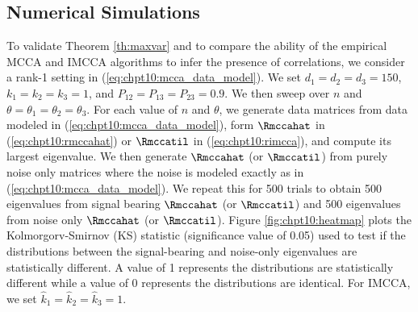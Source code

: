 \subsection{Numerical Simulations}\label{sec:num_sims}

To validate Theorem \ref{th:maxvar} and to compare the ability of the empirical MCCA
and IMCCA algorithms to infer the presence of correlations, we consider a rank-1 setting in (\ref{eq:chpt10:mcca_data_model}).  We set $d_1 =d_2=d_3=150$, $k_1=k_2=k_3=1$, and
$P_{12}=P_{13}=P_{23}=0.9$. We then sweep over $n$ and
$\theta=\theta_1=\theta_2=\theta_3$. For each value of $n$ and $\theta$, we generate data
matrices from data modeled in (\ref{eq:chpt10:mcca_data_model}), form $\Rmccahat$ in
(\ref{eq:chpt10:rmccahat}) or $\Rmccatil$ in (\ref{eq:chpt10:rimcca}), and compute its
largest eigenvalue. We then generate $\Rmccahat$ (or $\Rmccatil$) from purely noise only
matrices where the noise is modeled exactly as in (\ref{eq:chpt10:mcca_data_model}). We
repeat this for 500 trials to obtain 500 eigenvalues from signal bearing $\Rmccahat$ (or
$\Rmccatil$) and 500 eigenvalues from noise only $\Rmccahat$ (or $\Rmccatil$). Figure
\ref{fig:chpt10:heatmap} plots the Kolmorgorv-Smirnov (KS) statistic (significance value
of 0.05) used to test if the distributions between the signal-bearing and noise-only
eigenvalues are statistically different. A value of 1 represents the distributions are
statistically different while a value of 0 represents the distributions are identical. For
IMCCA, we set $\widehat{k}_1=\widehat{k}_2=\widehat{k}_3=1$.

